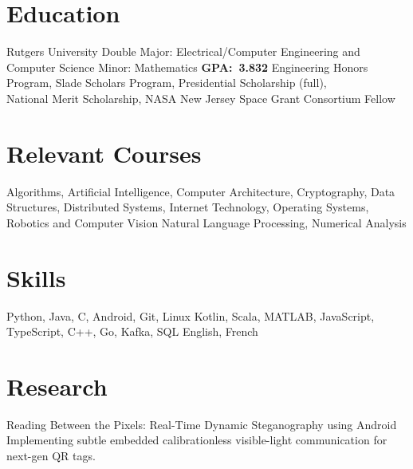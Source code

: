 \documentclass[11pt,letterpaper]{moderncv}
\begin{document}
\section{Education}

    {Rutgers University}
    {Double Major: Electrical/Computer Engineering and Computer Science}
    {Minor: Mathematics}
    {\textbf{GPA:~3.832}}
    {Engineering Honors Program, Slade Scholars Program, Presidential Scholarship (full),\\National Merit Scholarship, NASA New Jersey Space Grant Consortium Fellow}


\section{Relevant Courses}
       {Algorithms, Artificial Intelligence, Computer Architecture, Cryptography, Data Structures, Distributed Systems, Internet Technology, Operating Systems, Robotics and Computer Vision
       }
       {Natural Language Processing, Numerical Analysis}

\section{Skills}
       {Python, Java, C, Android, Git, Linux}
       {Kotlin, Scala, MATLAB, JavaScript, TypeScript, C++, Go, Kafka, SQL}
       {English, French}

\section{Research}
		{Reading Between the Pixels: Real-Time Dynamic Steganography using Android}
        {}
        {}
        {}
        {Implementing subtle embedded calibrationless visible-light communication for next-gen QR tags.}

%
\end{document}
